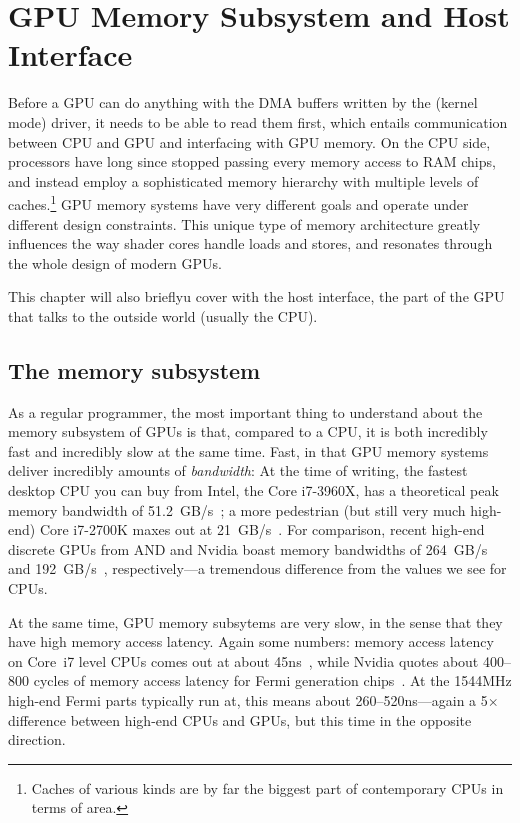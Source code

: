 \chapter{GPU Memory Subsystem and Host Interface}
\label{ch:memory}


Before a GPU can do anything with the DMA buffers written by the (kernel mode) driver,
it needs to be able to read them first, which entails communication between CPU and GPU
and interfacing with GPU memory. On the CPU side, processors have long since stopped
passing every memory access to RAM chips, and instead employ a sophisticated memory
hierarchy with multiple levels of caches.\footnote{Caches of various kinds are by far
the biggest part of contemporary CPUs in terms of area.} GPU memory systems have very
different goals and operate under different design constraints. This unique type of
memory architecture greatly influences the way shader cores handle loads and stores,
and resonates through the whole design of modern GPUs.

This chapter will also brieflyu cover with the host interface, the part of the GPU that talks
to the outside world (usually the CPU).

\section{The memory subsystem}

As a regular programmer, the most important thing to understand about the memory
subsystem of GPUs is that, compared to a CPU, it is both incredibly fast and incredibly
slow at the same time. Fast, in that GPU memory systems deliver incredibly amounts of
\emph{bandwidth}: At the time of writing, the fastest desktop CPU you can buy from Intel,
the Core i7-3960X, has a theoretical peak memory bandwidth of 51.2~GB/s~\citep{membw-i7-3960x};
a more pedestrian (but still very much high-end) Core i7-2700K maxes out at 21~GB/s~\citep{membw-i7-2700k}.
For comparison, recent high-end discrete GPUs from AND and Nvidia boast memory bandwidths of
264~GB/s~\citep{membw-radeonhd-7970} and 192~GB/s~\citep{membw-geforce-gtx680}, respectively---a
tremendous difference from the values we see for CPUs.

At the same time, GPU memory subsytems are very slow, in the sense that they have high
memory access latency. Again some numbers: memory access latency on Core~i7 level CPUs comes
out at about 45ns~\citep{memlat-i7}, while Nvidia quotes about 400--800 cycles of memory access
latency for Fermi generation chips~\citep{memlat-nvidia}. At the 1544MHz high-end Fermi parts
typically run at, this means about 260--520ns---again a 5$\times$ difference between high-end
CPUs and GPUs, but this time in the opposite direction.

